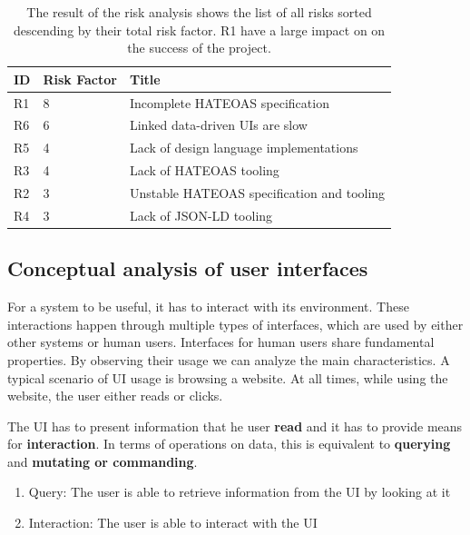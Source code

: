 \begin{table}[!htb]
  \begin{center}
    \begin{tabular}{|l|l|l|}
      \hline
      \textbf{ID} & \textbf{Risk Factor} & \textbf{Title} \\
      \hline
      \hline
      \rowcolor{yellow}
      R1 & 8 & Incomplete HATEOAS specification \\
      \hline
      R6 & 6 & Linked data-driven UIs are slow \\
      \hline
      R5 & 4 & Lack of design language implementations \\
      \hline
      R3 & 4 & Lack of HATEOAS tooling \\
      \hline
      R2 & 3 & Unstable HATEOAS specification and tooling \\
      \hline
      R4 & 3 & Lack of JSON-LD tooling \\
      \hline
    \end{tabular}
    \caption{The result of the risk analysis shows the list of all risks sorted descending by their total risk factor. R1 have a large impact on on the success of the project.}
    \label{tab:riskanalysis}
  \end{center}
\end{table}

\subsection{Conceptual analysis of user interfaces}
For a system to be useful, it has to interact with its environment. These interactions happen through multiple types of interfaces, which are used by either other systems or human users.
Interfaces for human users share fundamental properties. By observing their usage we can analyze the main characteristics. A typical scenario of UI usage is browsing a website. At all times, while using the website, the user either reads or clicks.

The UI has to present information that he user \textbf{read} and it has to provide means for \textbf{interaction}. In terms of operations on data, this is equivalent to \textbf{querying} and \textbf{mutating or commanding}.

\begin{enumerate}
  \item Query: The user is able to retrieve information from the UI by looking at it
  \item Interaction: The user is able to interact with the UI
\end{enumerate}

